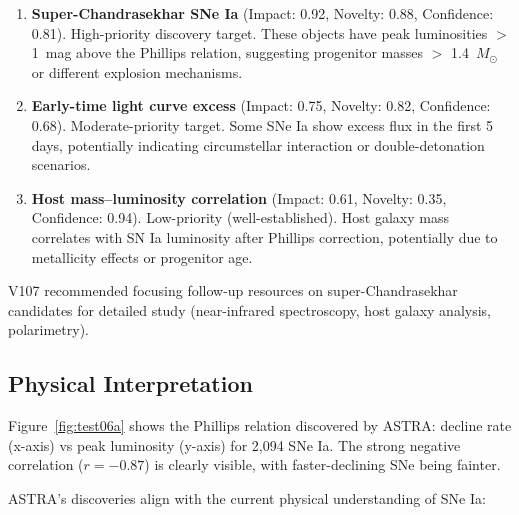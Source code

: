 \documentclass[usenatbib]{rasti}
\begin{document}
\begin{enumerate}
\item \textbf{Super-Chandrasekhar SNe Ia} (Impact: 0.92, Novelty: 0.88, Confidence: 0.81). High-priority discovery target. These objects have peak luminosities $>$ 1~mag above the Phillips relation, suggesting progenitor masses $>$ 1.4~$M_{\odot}$ or different explosion mechanisms.

\item \textbf{Early-time light curve excess} (Impact: 0.75, Novelty: 0.82, Confidence: 0.68). Moderate-priority target. Some SNe Ia show excess flux in the first 5 days, potentially indicating circumstellar interaction or double-detonation scenarios.

\item \textbf{Host mass--luminosity correlation} (Impact: 0.61, Novelty: 0.35, Confidence: 0.94). Low-priority (well-established). Host galaxy mass correlates with SN Ia luminosity after Phillips correction, potentially due to metallicity effects or progenitor age.
\end{enumerate}

V107 recommended focusing follow-up resources on super-Chandrasekhar candidates for detailed study (near-infrared spectroscopy, host galaxy analysis, polarimetry).

\subsection{Physical Interpretation}

Figure~\ref{fig:test06a} shows the Phillips relation discovered by ASTRA: decline rate (x-axis) vs peak luminosity (y-axis) for 2,094 SNe Ia. The strong negative correlation ($r = -0.87$) is clearly visible, with faster-declining SNe being fainter.

ASTRA's discoveries align with the current physical understanding of SNe Ia:
\end{document}
